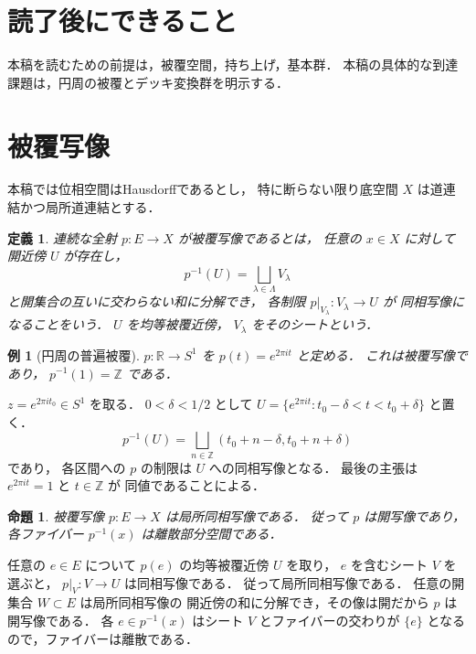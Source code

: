 \documentclass[a5paper,10pt,onecolumn]{jsarticle}
\makeatletter
\theoremstyle{mathnotetheorem}
\newtheorem{definition}[theorem]{定義}
\newtheorem{proposition}[theorem]{命題}
\newtheorem{example}[theorem]{例}
\renewcommand{\proofname}{証明}
\renewenvironment{proof}[1][\proofname]{%
  \par\pushQED{\qed}\normalfont\topsep4\p@\@plus2\p@\relax
  \trivlist\item[\hskip\labelsep\bfseries #1]\ignorespaces
}{\popQED\endtrivlist\@endpefalse}
\makeatother
\begin{document}
\section*{読了後にできること}
本稿を読むための前提は，被覆空間，持ち上げ，基本群．
本稿の具体的な到達課題は，円周の被覆とデッキ変換群を明示する．

\section{被覆写像}

本稿では位相空間はHausdorffであるとし，
特に断らない限り底空間 $X$ は道連結かつ局所道連結とする．

\begin{definition}
連続な全射 $p:E\to X$ が\emph{被覆写像}であるとは，
任意の $x\in X$ に対して開近傍 $U$ が存在し，
\[
 p^{-1}(U)=\bigsqcup_{\lambda\in\Lambda}V_\lambda
\]
と開集合の互いに交わらない和に分解でき，
各制限 $p|_{V_\lambda}:V_\lambda\to U$ が
同相写像になることをいう．
$U$ を\emph{均等被覆近傍}，
$V_\lambda$ をその\emph{シート}という．
\end{definition}

\begin{example}[円周の普遍被覆]
$p:\mathbb R\to S^1$ を $p(t)=e^{2\pi it}$ と定める．
これは被覆写像であり，
$p^{-1}(1)=\mathbb Z$ である．
\end{example}
\begin{proof}
$z=e^{2\pi it_0}\in S^1$ を取る．
$0<\delta<1/2$ として
$U=\{e^{2\pi it}:t_0-\delta<t<t_0+\delta\}$
と置く．
\[
 p^{-1}(U)=
 \bigsqcup_{n\in\mathbb Z}
 (t_0+n-\delta,t_0+n+\delta)
\]
であり，
各区間への $p$ の制限は $U$ への同相写像となる．
最後の主張は $e^{2\pi it}=1$ と $t\in\mathbb Z$ が
同値であることによる．
\end{proof}

\begin{proposition}\label{prop:local-homeo}
被覆写像 $p:E\to X$ は局所同相写像である．
従って $p$ は開写像であり，
各ファイバー $p^{-1}(x)$ は離散部分空間である．
\end{proposition}
\begin{proof}
任意の $e\in E$ について $p(e)$ の均等被覆近傍 $U$ を取り，
$e$ を含むシート $V$ を選ぶと，
$p|_V:V\to U$ は同相写像である．
従って局所同相写像である．
任意の開集合 $W\subset E$ は局所同相写像の
開近傍の和に分解でき，その像は開だから $p$ は開写像である．
各 $e\in p^{-1}(x)$ はシート $V$ とファイバーの交わりが
$\{e\}$ となるので，ファイバーは離散である．
\end{proof}
\end{document}
